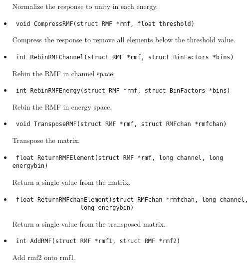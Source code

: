 \documentclass[11pt]{book}
\begin{document}
\begin{itemize}
               Normalize the response to unity in each energy.

\item      \begin{verbatim} void CompressRMF(struct RMF *rmf, float threshold)\end{verbatim}

               Compress the response to remove all elements 
               below the threshold value.

\item      \begin{verbatim} int RebinRMFChannel(struct RMF *rmf, struct BinFactors *bins)\end{verbatim}

               Rebin the RMF in channel space.

\item      \begin{verbatim} int RebinRMFEnergy(struct RMF *rmf, struct BinFactors *bins)\end{verbatim}

               Rebin the RMF in energy space.

\item      \begin{verbatim} void TransposeRMF(struct RMF *rmf, struct RMFchan *rmfchan)\end{verbatim}

               Transpose the matrix.

\item      \begin{verbatim} float ReturnRMFElement(struct RMF *rmf, long channel, long energybin)\end{verbatim}

               Return a single value from the matrix.

\item      \begin{verbatim} float ReturnRMFchanElement(struct RMFchan *rmfchan, long channel, 
                   long energybin)\end{verbatim}

               Return a single value from the transposed matrix.

\item      \begin{verbatim} int AddRMF(struct RMF *rmf1, struct RMF *rmf2)\end{verbatim}

               Add rmf2 onto rmf1.

\end{itemize}
\end{document}
